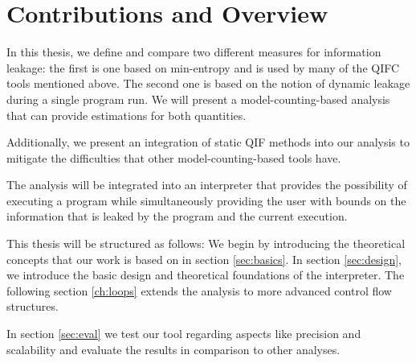 \section{Contributions and Overview}
In this thesis, we define and compare two different measures for information leakage: the first is one based on min-entropy and is used by many of the QIFC tools mentioned above. The second one is based on the notion of dynamic leakage during a single program run. We will present a model-counting-based analysis that can provide estimations for both quantities.

Additionally, we present an integration of static QIF methods into our analysis to mitigate the difficulties that other model-counting-based tools have.

The analysis will be integrated into an interpreter that provides the possibility of executing a program while simultaneously providing the user with bounds on the information that is leaked by the program and the current execution.

This thesis will be structured as follows: We begin by introducing the theoretical concepts that our work is based on in section \ref{sec:basics}. In section \ref{sec:design}, we introduce the basic design and theoretical foundations of the interpreter. The following section \ref{ch:loops} extends the analysis to more advanced control flow structures.

In section \ref{sec:eval} we test our tool regarding aspects like precision and scalability and evaluate the results in comparison to other analyses.
